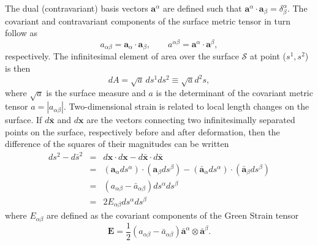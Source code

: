 \documentclass[
pre,
 twocolumn,
amsmath,
amssymb
]{revtex4}
\begin{document}
The dual (contravariant) basis vectors $\bm{a}^{\alpha}$ are defined
such that $\bm{a}^{\alpha} \cdot \bm{a}_{\beta} =
\delta_{\beta}^{\alpha}$.
%
%
The covariant and contravariant components of the surface metric
tensor in turn follow as
%
\begin{equation}
  a_{\alpha \beta} = \bm{a}_\alpha \cdot \bm{a}_\beta , \qquad
  a^{\alpha \beta} = \bm{a}^\alpha \cdot \bm{a}^\beta ,
\end{equation}
respectively.
%
The infinitesimal element of area over the surface $\mathcal{S}$
at point ($s^{1}, s^{2}$) is then
%
\begin{equation}
  dA = \sqrt{a} \, ds^{1}ds^{2} \equiv \sqrt{a} d^{2}s ,
\end{equation}
%
where $\sqrt{a}$ is the surface measure and $a$ is the determinant of
the covariant metric tensor
%
\(
  a = | a_{\alpha\beta} | .
\)
%
Two-dimensional strain is related to local length changes on the
surface.  If $d\bar{\bm{x}}$ and $d\bm{x}$ are the vectors connecting
two infinitesimally separated points on the surface, respectively
before and after deformation, then the difference of the squares of their magnitudes can be written
\begin{eqnarray*}
ds^2 - d\bar{s}^2 &=& d\bm{x}\cdot d\bm{x} - d\bar{\bm{x}}\cdot d\bar{\bm{x}}\\
 &=& (\bm{a}_\alpha ds^\alpha)\cdot(\bm{a}_\beta ds^\beta) 
 - (\bar{\bm{a}}_\alpha ds^\alpha)\cdot(\bar{\bm{a}}_\beta ds^\beta)\\
 &=& (a_{\alpha\beta} - \bar{a}_{\alpha\beta}) ds^\alpha ds^\beta\\
 &=& 2 E_{\alpha\beta} ds^\alpha ds^\beta
\end{eqnarray*}
where $E_{\alpha\beta}$ are defined as the covariant components of the
Green Strain tensor
\begin{equation}
\mathbf{E} = \frac{1}{2}(a_{\alpha\beta} -
\bar{a}_{\alpha\beta})\bar{\bm{a}}^\alpha \otimes \bar{\bm{a}}^\beta .
\end{equation}
\end{document}
